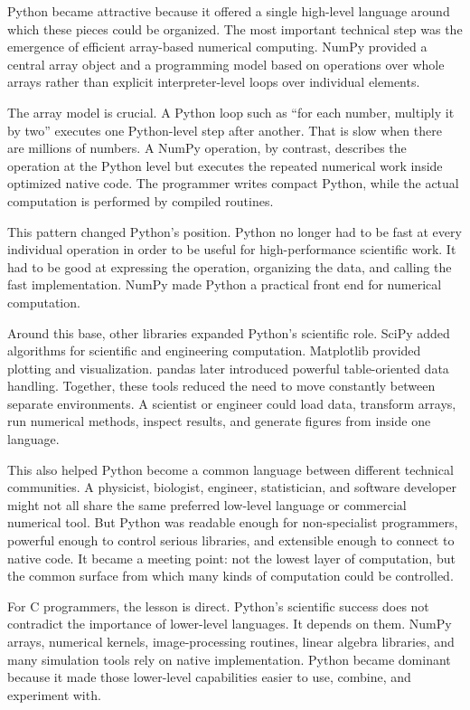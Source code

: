 Python became attractive because it offered a single high-level language around which these pieces could be organized. The most important technical step was the emergence of efficient array-based numerical computing. NumPy provided a central array object and a programming model based on operations over whole arrays rather than explicit interpreter-level loops over individual elements.

The array model is crucial. A Python loop such as ``for each number, multiply it by two'' executes one Python-level step after another. That is slow when there are millions of numbers. A NumPy operation, by contrast, describes the operation at the Python level but executes the repeated numerical work inside optimized native code. The programmer writes compact Python, while the actual computation is performed by compiled routines.

This pattern changed Python's position. Python no longer had to be fast at every individual operation in order to be useful for high-performance scientific work. It had to be good at expressing the operation, organizing the data, and calling the fast implementation. NumPy made Python a practical front end for numerical computation.

Around this base, other libraries expanded Python's scientific role. SciPy added algorithms for scientific and engineering computation. Matplotlib provided plotting and visualization. pandas later introduced powerful table-oriented data handling. Together, these tools reduced the need to move constantly between separate environments. A scientist or engineer could load data, transform arrays, run numerical methods, inspect results, and generate figures from inside one language.

This also helped Python become a common language between different technical communities. A physicist, biologist, engineer, statistician, and software developer might not all share the same preferred low-level language or commercial numerical tool. But Python was readable enough for non-specialist programmers, powerful enough to control serious libraries, and extensible enough to connect to native code. It became a meeting point: not the lowest layer of computation, but the common surface from which many kinds of computation could be controlled.

For C programmers, the lesson is direct. Python's scientific success does not contradict the importance of lower-level languages. It depends on them. NumPy arrays, numerical kernels, image-processing routines, linear algebra libraries, and many simulation tools rely on native implementation. Python became dominant because it made those lower-level capabilities easier to use, combine, and experiment with.

